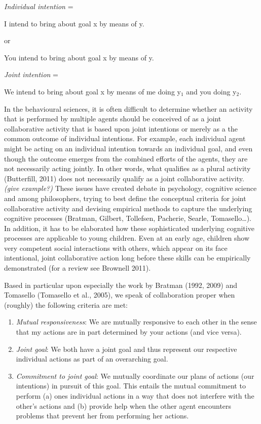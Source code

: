 \documentclass{article}
\begin{document}
\textit{Individual intention} =

I intend to bring about goal x by means of y.

or

You intend to bring about goal x by means of y.

\textit{Joint intention} = 

We intend to bring about goal x by means of me doing y$_1$ and you
doing y$_2$.

In the behavioural sciences, it is often difficult to determine whether an
activity that is performed by multiple agents should be conceived of as a joint
collaborative activity that is based upon joint intentions or merely as a the
common outcome of individual intentions. For example, each individual agent
might be acting on an individual intention towards an individual goal, and even
though the outcome emerges from the combined efforts of the agents, they are
not necessarily acting jointly. In other words, what qualifies as a plural
activity (Butterfill, 2011) does not necessarily qualify as a joint
collaborative activity. \textit{(give example?)} These issues have created
debate in psychology, cognitive science and among philosophers, trying to best
define the conceptual criteria for joint collaborative activity and devising
empirical methods to capture the underlying cognitive processes (Bratman,
Gilbert, Tollefsen, Pacherie, Searle, Tomasello{\dots}). In addition, it has to
be elaborated how these sophisticated underlying cognitive processes are
applicable to young children. Even at an early age, children show very
competent social interactions with others, which appear on its face
intentional, joint collaborative action long before these skills can be
empirically demonstrated (for a review see Brownell 2011). 

Based in particular upon especially the work by Bratman (1992, 2009) and
Tomasello (Tomasello et al., 2005), we speak of collaboration proper when
(roughly) the following criteria are met:

\begin{enumerate}

\item \textit{Mutual responsiveness}: We are mutually responsive to each other
in the sense that my actions are in part determined by your actions (and vice
versa).

\item \textit{Joint goal}: We both have a joint goal and thus represent our
respective individual actions as part of an overarching goal.

\item \textit{Commitment to joint goal}: We mutually coordinate our plans of
actions (our intentions) in pursuit of this goal. This entails the mutual
commitment to perform (a) ones individual actions in a way that does not
interfere with the other's actions and (b) provide help when the other agent
encounters problems that prevent her from performing her actions.

\end{enumerate}
\end{document}
